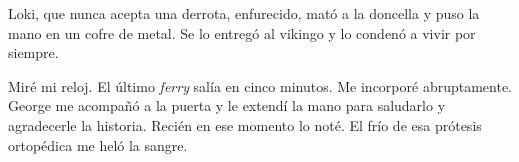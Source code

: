 \documentclass[11pt,twoside,openright,a6paper]{book}
\begin{document}
Loki, que nunca acepta una derrota, enfurecido, mató a la doncella y puso la mano en un cofre de metal. Se lo entregó al vikingo y lo condenó a vivir por siempre.

Miré mi reloj. El último \emph{ferry} salía en cinco minutos. Me incorporé abruptamente. George me acompañó a la puerta y le extendí la mano para saludarlo y agradecerle la historia. Recién en ese momento lo noté. El frío de esa prótesis ortopédica me heló la sangre.
\end{document}
